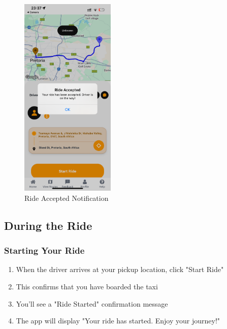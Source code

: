 \documentclass[12pt]{article}
\begin{document}
\begin{figure}[H]
  \centering
  \includegraphics[width=0.4\textwidth]{ride_accepted.png}
  \caption{Ride Accepted Notification}
\end{figure}

\subsection{During the Ride}

\subsubsection{Starting Your Ride}
\begin{enumerate}
    \item When the driver arrives at your pickup location, click "Start Ride"
    \item This confirms that you have boarded the taxi
    \item You'll see a "Ride Started" confirmation message
    \item The app will display "Your ride has started. Enjoy your journey!"
\end{enumerate}
\end{document}
